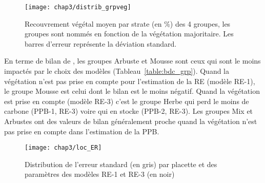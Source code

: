 \begin{figure}
\centering
\texttt{[image: chap3/distrib\_grpveg]}
\caption{Recouvrement végétal moyen par strate (en \si{\percent}) des 4 groupes, les groupes sont nommés en fonction de la végétation majoritaire. Les barres d'erreur représente la déviation standard.}
\label{fig:distrib_grpveg}
\end{figure}

En terme de bilan de \coo, les groupes Arbuste et Mousse sont ceux qui sont le moins impactés par le choix des modèles (Tableau~\ref{table:bdc_grp}).
Quand la végétation n'est pas prise en compte pour l'estimation de la RE (modèle RE-1), le groupe Mousse est celui dont le bilan est le moins négatif.
Quand la végétation est prise en compte (modèle RE-3) c'est le groupe Herbe qui perd le moins de carbone (PPB-1, RE-3) voire qui en stocke (PPB-2, RE-3).
Les groupes Mix et Arbustes ont des valeurs de bilan généralement proche quand la végétation n'est pas prise en compte dans l'estimation de la PPB.




\begin{figure}
\centering
\texttt{[image: chap3/loc\_ER]}
\caption{Distribution de l'erreur standard (en gris) par placette et des paramètres des modèles RE-1 et RE-3 (en noir)}
\label{fig:loc_ER}
\end{figure}


